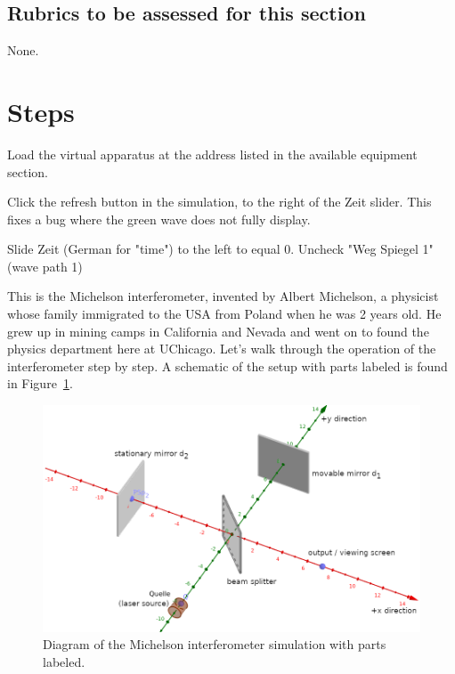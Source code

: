 \subsection{Rubrics to be assessed for this section}

None.

\section{Steps}

\begin{steps}
	\item Load the virtual apparatus at the address listed in the available equipment section.
	
	\item Click the refresh button in the simulation, to the right of the Zeit slider. This fixes a bug where the green wave does not fully display.

	\item Slide Zeit (German for "time") to the left to equal 0. Uncheck "Weg Spiegel 1" (wave path 1)
\end{steps}

This is the Michelson interferometer, invented by Albert Michelson, a physicist whose family immigrated to the USA from Poland when he was 2 years old. He grew up in mining camps in California and Nevada and went on to found the physics department here at UChicago. Let's walk through the operation of the interferometer step by step. A schematic of the setup with parts labeled is found in Figure\ \ref{mir:fig:setup}.

\begin{figure}
	\centering
	\includegraphics[width=\textwidth]{michelson-interferometer-remote/michelson-setup-geogebra}
	\caption{Diagram of the Michelson interferometer simulation with parts labeled.}\label{mir:fig:setup}
\end{figure}

